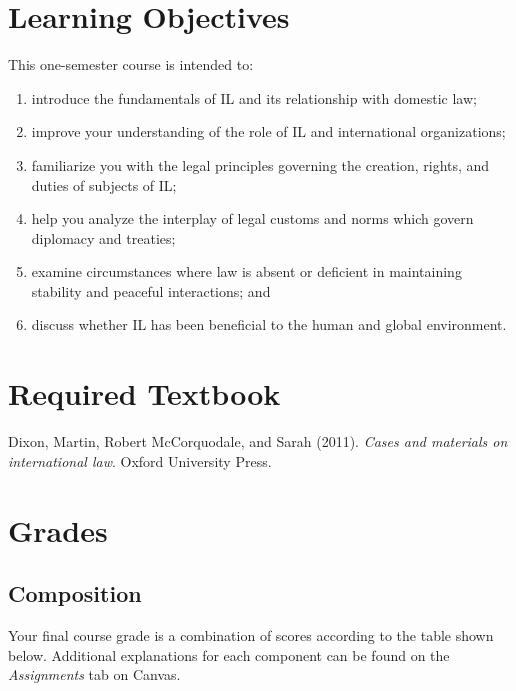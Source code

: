 \documentclass[10pt,]{article}
\providecommand{\tightlist}{%
  \setlength{\itemsep}{0pt}\setlength{\parskip}{0pt}}
\begin{document}
\hypertarget{learning-objectives}{%
\section{Learning Objectives}\label{learning-objectives}}

This one-semester course is intended to:

\begin{enumerate}
\def\labelenumi{\arabic{enumi}.}
\tightlist
\item
  introduce the fundamentals of IL and its relationship with domestic
  law;
\item
  improve your understanding of the role of IL and international
  organizations;
\item
  familiarize you with the legal principles governing the creation,
  rights, and duties of subjects of IL;
\item
  help you analyze the interplay of legal customs and norms which govern
  diplomacy and treaties;
\item
  examine circumstances where law is absent or deficient in maintaining
  stability and peaceful interactions; and
\item
  discuss whether IL has been beneficial to the human and global
  environment.
\end{enumerate}

\hypertarget{required-textbook}{%
\section{Required Textbook}\label{required-textbook}}

Dixon, Martin, Robert McCorquodale, and Sarah (2011).
\emph{Cases and materials on international law}. Oxford University
Press.

\newpage

\hypertarget{grades}{%
\section{Grades}\label{grades}}

\hypertarget{composition}{%
\subsection{Composition}\label{composition}}

Your final course grade is a combination of scores according to the
table shown below. Additional explanations for each component can be
found on the \emph{Assignments} tab on Canvas.
\end{document}
